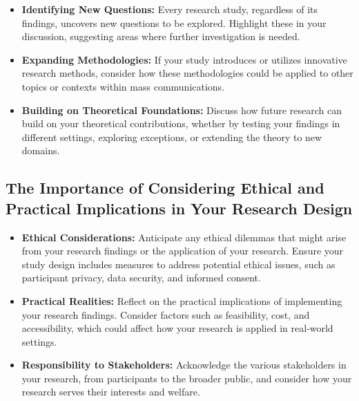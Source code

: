 \documentclass[
]{book}
\begin{document}
\begin{itemize}
\item
  \textbf{Identifying New Questions:} Every research study, regardless of its findings, uncovers new questions to be explored. Highlight these in your discussion, suggesting areas where further investigation is needed.
\item
  \textbf{Expanding Methodologies:} If your study introduces or utilizes innovative research methods, consider how these methodologies could be applied to other topics or contexts within mass communications.
\item
  \textbf{Building on Theoretical Foundations:} Discuss how future research can build on your theoretical contributions, whether by testing your findings in different settings, exploring exceptions, or extending the theory to new domains.
\end{itemize}

\hypertarget{the-importance-of-considering-ethical-and-practical-implications-in-your-research-design}{%
\subsection*{The Importance of Considering Ethical and Practical Implications in Your Research Design}\label{the-importance-of-considering-ethical-and-practical-implications-in-your-research-design}}

\begin{itemize}
\item
  \textbf{Ethical Considerations:} Anticipate any ethical dilemmas that might arise from your research findings or the application of your research. Ensure your study design includes measures to address potential ethical issues, such as participant privacy, data security, and informed consent.
\item
  \textbf{Practical Realities:} Reflect on the practical implications of implementing your research findings. Consider factors such as feasibility, cost, and accessibility, which could affect how your research is applied in real-world settings.
\item
  \textbf{Responsibility to Stakeholders:} Acknowledge the various stakeholders in your research, from participants to the broader public, and consider how your research serves their interests and welfare.
\end{itemize}
\end{document}
